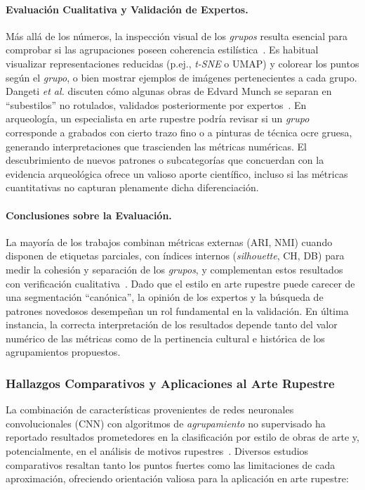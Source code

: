 \paragraph{Evaluación Cualitativa y Validación de Expertos.}
Más allá de los números, la inspección visual de los \textit{grupos} resulta esencial para comprobar si las agrupaciones poseen coherencia estilística~\cite{gultepe2018}.
Es habitual visualizar representaciones reducidas (p.ej., \textit{t-SNE} o UMAP) y colorear los puntos según el \textit{grupo}, o bien mostrar ejemplos de imágenes pertenecientes a cada grupo.
Dangeti \textit{et al.} discuten cómo algunas obras de Edvard Munch se separan en “subestilos” no rotulados, validados posteriormente por expertos~\cite{dangeti2024}.
En arqueología, un especialista en arte rupestre podría revisar si un \textit{grupo} corresponde a grabados con cierto trazo fino o a pinturas de técnica ocre gruesa, generando interpretaciones que trascienden las métricas numéricas.
El descubrimiento de nuevos patrones o subcategorías que concuerdan con la evidencia arqueológica ofrece un valioso aporte científico, incluso si las métricas cuantitativas no capturan plenamente dicha diferenciación.

\paragraph{Conclusiones sobre la Evaluación.}
La mayoría de los trabajos combinan métricas externas (ARI, NMI) cuando disponen de etiquetas parciales, con índices internos (\textit{silhouette}, CH, DB) para medir la cohesión y separación de los \textit{grupos}, y complementan estos resultados con verificación cualitativa~\cite{guerin2018,dangeti2024}.
Dado que el estilo en arte rupestre puede carecer de una segmentación “canónica”, la opinión de los expertos y la búsqueda de patrones novedosos desempeñan un rol fundamental en la validación.
En última instancia, la correcta interpretación de los resultados depende tanto del valor numérico de las métricas como de la pertinencia cultural e histórica de los agrupamientos propuestos.

\subsubsection{Hallazgos Comparativos y Aplicaciones al Arte Rupestre}

La combinación de características provenientes de redes neuronales convolucionales (CNN) con algoritmos de \textit{agrupamiento} no supervisado ha reportado resultados prometedores en la clasificación por estilo de obras de arte y, potencialmente, en el análisis de motivos rupestres~\cite{dangeti2024,castellano2022}.
Diversos estudios comparativos resaltan tanto los puntos fuertes como las limitaciones de cada aproximación, ofreciendo orientación valiosa para la aplicación en arte rupestre:

